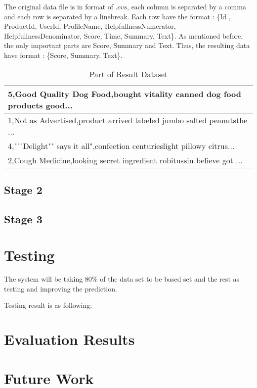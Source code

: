 The original data file is in format of \(.cvs\), each column is separated by a comma and each row is separated by a linebreak. Each row have the format : \{Id , ProductId, UserId, ProfileName, HelpfullnessNumerator, HelpfullnessDenominator, Score, Time, Summary, Text\}. As mentioned before, the only important parts are Score, Summary and Text. Thus, the resulting data have format : \{Score, Summary, Text\}.\\

\begin{table}
  \caption{Part of Result Dataset}
  \label{tab:res}
  \begin{tabular}{ | p{9cm} | }
    \hline
	5,Good Quality Dog Food,bought vitality canned dog food products good... \\ \hline
	1,Not as Advertised,product arrived labeled jumbo salted peanutsthe ... \\ \hline
	4,"""Delight"" says it all",confection centurieslight pillowy citrus...\\ \hline
	2,Cough Medicine,looking secret ingredient robitussin believe  got ... \\ 
    \hline
  \end{tabular}
\end{table}



\subsection{Stage 2}
\subsection{Stage 3}


\section{Testing}
The system will be taking 80\% of the data set to be based set and the rest as testing and improving the prediction.

Testing result is as following:
\section{Evaluation Results}

\section{Future Work}
